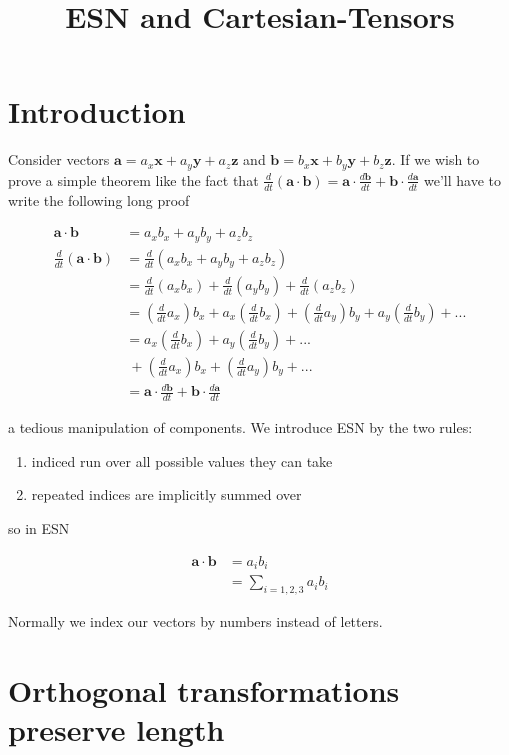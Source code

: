 \documentclass{article}
\title{ESN and Cartesian-Tensors}
\date{}
\newcommand{\mb}{\mathbf}
\begin{document}
\maketitle

\section{Introduction}

Consider vectors $\mb{a} = a_x\mb{x} + a_y\mb{y} + a_z\mb{z}$ and $\mb{b} = b_x\mb{x} + b_y\mb{y} + b_z\mb{z}$. If we wish to prove a simple theorem like the fact that $\frac{d}{dt} (\mb{a} \cdot \mb{b}) = \mb{a} \cdot \frac{d\mb{b}}{dt} + \mb{b} \cdot \frac{d\mb{a}}{dt}$ we'll have to write the following long proof

\begin{align}
\mb{a} \cdot \mb{b} &= a_x b_x + a_y b_y + a_z b_z \\
\frac{d}{dt} (\mb{a} \cdot \mb{b}) &= \frac{d}{dt}(a_x b_x + a_y b_y + a_z b_z) \\
&= \frac{d}{dt}(a_x b_x) + \frac{d}{dt}(a_y b_y) + \frac{d}{dt}(a_z b_z) \\
&= (\frac{d}{dt}a_x) b_x + a_x (\frac{d}{dt}b_x) + (\frac{d}{dt}a_y) b_y + a_y (\frac{d}{dt}b_y) + ... \\
&= a_x (\frac{d}{dt}b_x) + a_y (\frac{d}{dt}b_y) + ... \\
&\ + (\frac{d}{dt}a_x) b_x + (\frac{d}{dt}a_y) b_y + ... \\
&= \mb{a} \cdot \frac{d\mb{b}}{dt} + \mb{b} \cdot \frac{d\mb{a}}{dt}
\end{align}

a tedious manipulation of components. We introduce ESN by the two rules:

\begin{enumerate}
\item{indiced run over all possible values they can take}
\item{repeated indices are implicitly summed over}
\end{enumerate}

so in ESN

\begin{align}
\mb{a} \cdot \mb{b} &= a_i b_i \\
&= \sum_{i=1,2,3} a_i b_i
\end{align}

Normally we index our vectors by numbers instead of letters. 

\section{Orthogonal transformations preserve length}
\end{document}
